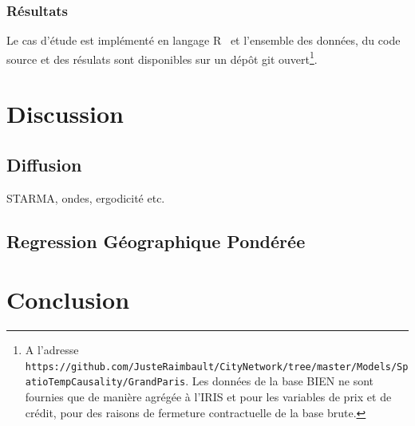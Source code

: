 \documentclass[french]{./sageo}
\begin{document}
\subsubsection{Résultats}

Le cas d'étude est implémenté en langage R~\cite{rcoreteam} et l'ensemble des données, du code source et des résulats sont disponibles sur un dépôt git ouvert\footnote{A l'adresse \texttt{https://github.com/JusteRaimbault/CityNetwork/tree/master/Models/SpatioTempCausality/GrandParis}. Les données de la base BIEN ne sont fournies que de manière agrégée à l'IRIS et pour les variables de prix et de crédit, pour des raisons de fermeture contractuelle de la base brute.}.






\section{Discussion}

\subsection{Diffusion}

STARMA, ondes, ergodicité etc.


\subsection{Regression Géographique Pondérée}







\section{Conclusion}














\end{document}
